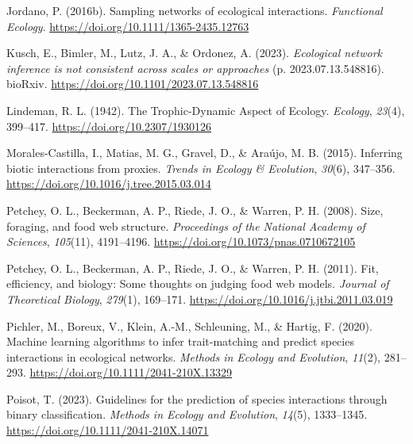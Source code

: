 \documentclass[
]{article}
\newlength{\cslhangindent}
\newenvironment{CSLReferences}[2] %
 {\begin{list}{}{%
  \setlength{\itemindent}{0pt}
  \setlength{\leftmargin}{0pt}
  \setlength{\parsep}{0pt}
  \ifodd #1
   \setlength{\leftmargin}{\cslhangindent}
   \setlength{\itemindent}{-1\cslhangindent}
  \fi
  \setlength{\itemsep}{#2\baselineskip}}}
 {\end{list}}
\begin{document}
\begin{CSLReferences}{1}{0}
Jordano, P. (2016b). Sampling networks of ecological interactions.
\emph{Functional Ecology}. \url{https://doi.org/10.1111/1365-2435.12763}

Kusch, E., Bimler, M., Lutz, J. A., \& Ordonez, A. (2023).
\emph{Ecological network inference is not consistent across scales or
approaches} (p. 2023.07.13.548816). bioRxiv.
\url{https://doi.org/10.1101/2023.07.13.548816}

Lindeman, R. L. (1942). The {Trophic-Dynamic Aspect} of {Ecology}.
\emph{Ecology}, \emph{23}(4), 399--417.
\url{https://doi.org/10.2307/1930126}

Morales-Castilla, I., Matias, M. G., Gravel, D., \& Araújo, M. B.
(2015). Inferring biotic interactions from proxies. \emph{Trends in
Ecology \& Evolution}, \emph{30}(6), 347--356.
\url{https://doi.org/10.1016/j.tree.2015.03.014}

Petchey, O. L., Beckerman, A. P., Riede, J. O., \& Warren, P. H. (2008).
Size, foraging, and food web structure. \emph{Proceedings of the
National Academy of Sciences}, \emph{105}(11), 4191--4196.
\url{https://doi.org/10.1073/pnas.0710672105}

Petchey, O. L., Beckerman, A. P., Riede, J. O., \& Warren, P. H. (2011).
Fit, efficiency, and biology: {Some} thoughts on judging food web
models. \emph{Journal of Theoretical Biology}, \emph{279}(1), 169--171.
\url{https://doi.org/10.1016/j.jtbi.2011.03.019}

Pichler, M., Boreux, V., Klein, A.-M., Schleuning, M., \& Hartig, F.
(2020). Machine learning algorithms to infer trait-matching and predict
species interactions in ecological networks. \emph{Methods in Ecology
and Evolution}, \emph{11}(2), 281--293.
\url{https://doi.org/10.1111/2041-210X.13329}

Poisot, T. (2023). Guidelines for the prediction of species interactions
through binary classification. \emph{Methods in Ecology and Evolution},
\emph{14}(5), 1333--1345. \url{https://doi.org/10.1111/2041-210X.14071}


\end{CSLReferences}
\end{document}

